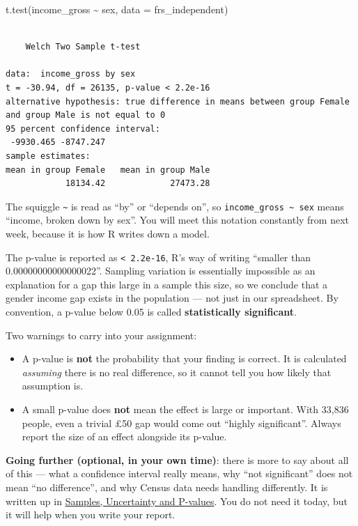 \documentclass[
  letterpaper,
  DIV=11,
  numbers=noendperiod]{scrreprt}
\newenvironment{Shaded}{\begin{snugshade}}{\end{snugshade}}
\newcommand{\AttributeTok}[1]{\textcolor[rgb]{0.40,0.45,0.13}{#1}}
\newcommand{\FunctionTok}[1]{\textcolor[rgb]{0.28,0.35,0.67}{#1}}
\newcommand{\NormalTok}[1]{\textcolor[rgb]{0.00,0.23,0.31}{#1}}
\newcommand{\SpecialCharTok}[1]{\textcolor[rgb]{0.37,0.37,0.37}{#1}}
\providecommand{\tightlist}{%
  \setlength{\itemsep}{0pt}\setlength{\parskip}{0pt}}
\begin{document}
\begin{Shaded}
\begin{Highlighting}[]
\FunctionTok{t.test}\NormalTok{(income\_gross }\SpecialCharTok{\textasciitilde{}}\NormalTok{ sex, }\AttributeTok{data =}\NormalTok{ frs\_independent)}
\end{Highlighting}
\end{Shaded}

\begin{verbatim}

    Welch Two Sample t-test

data:  income_gross by sex
t = -30.94, df = 26135, p-value < 2.2e-16
alternative hypothesis: true difference in means between group Female and group Male is not equal to 0
95 percent confidence interval:
 -9930.465 -8747.247
sample estimates:
mean in group Female   mean in group Male 
            18134.42             27473.28 
\end{verbatim}

The squiggle \texttt{\textasciitilde{}} is read as ``by'' or ``depends
on'', so \texttt{income\_gross\ \textasciitilde{}\ sex} means ``income,
broken down by sex''. You will meet this notation constantly from next
week, because it is how R writes down a model.

The p-value is reported as \texttt{\textless{}\ 2.2e-16}, R's way of
writing ``smaller than 0.00000000000000022''. Sampling variation is
essentially impossible as an explanation for a gap this large in a
sample this size, so we conclude that a gender income gap exists in the
population --- not just in our spreadsheet. By convention, a p-value
below 0.05 is called \textbf{statistically significant}.

Two warnings to carry into your assignment:

\begin{itemize}
\tightlist
\item
  A p-value is \textbf{not} the probability that your finding is
  correct. It is calculated \emph{assuming} there is no real difference,
  so it cannot tell you how likely that assumption is.
\item
  A small p-value does \textbf{not} mean the effect is large or
  important. With 33,836 people, even a trivial £50 gap would come out
  ``highly significant''. Always report the size of an effect alongside
  its p-value.
\end{itemize}

\textbf{Going further (optional, in your own time)}: there is more to
say about all of this --- what a confidence interval really means, why
``not significant'' does not mean ``no difference'', and why Census data
needs handling differently. It is written up in
\href{https://gdsl-ul.github.io/stats/general/inference.html}{Samples,
Uncertainty and P-values}. You do not need it today, but it will help
when you write your report.
\end{document}

